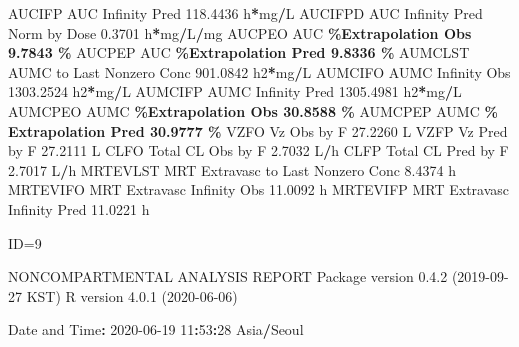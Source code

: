 \documentclass[
  10pt,
]{krantz}
\makeatletter
\newenvironment{Shaded}{\begin{snugshade}}{\end{snugshade}}
\newcommand{\DecValTok}[1]{\textcolor[rgb]{0.00,0.00,0.81}{#1}}
\newcommand{\FloatTok}[1]{\textcolor[rgb]{0.00,0.00,0.81}{#1}}
\newcommand{\NormalTok}[1]{#1}
\newcommand{\OperatorTok}[1]{\textcolor[rgb]{0.81,0.36,0.00}{\textbf{#1}}}
\newcommand{\StringTok}[1]{\textcolor[rgb]{0.31,0.60,0.02}{#1}}
\newenvironment{kframe}{%
\medskip{}
\setlength{\fboxsep}{.8em}
 \def\at@end@of@kframe{}%
 \ifinner\ifhmode%
  \def\at@end@of@kframe{\end{minipage}}%
  \begin{minipage}{\columnwidth}%
 \fi\fi%
 \def\FrameCommand##1{\hskip\@totalleftmargin \hskip-\fboxsep
 \colorbox{shadecolor}{##1}\hskip-\fboxsep
     \hskip-\linewidth \hskip-\@totalleftmargin \hskip\columnwidth}%
 \MakeFramed {\advance\hsize-\width
   \@totalleftmargin\z@ \linewidth\hsize
   \@setminipage}}%
 {\par\unskip\endMakeFramed%
 \at@end@of@kframe}
\renewenvironment{Shaded}{\begin{kframe}}{\end{kframe}}
\makeatother
\begin{document}
\begin{Shaded}
\begin{Highlighting}[]
\NormalTok{AUCIFP     AUC Infinity Pred                             }\FloatTok{118.4436}\NormalTok{ h}\OperatorTok{*}\NormalTok{mg}\OperatorTok{/}\NormalTok{L}
\NormalTok{AUCIFPD    AUC Infinity Pred Norm by Dose                  }\FloatTok{0.3701}\NormalTok{ h}\OperatorTok{*}\NormalTok{mg}\OperatorTok{/}\NormalTok{L}\OperatorTok{/}\NormalTok{mg}
\NormalTok{AUCPEO     AUC }\OperatorTok{\%Extrapolation Obs                          9.7843 \%}
\NormalTok{AUCPEP     AUC }\OperatorTok{\%Extrapolation Pred                         9.8336 \%}
\NormalTok{AUMCLST    AUMC to Last Nonzero Conc                     }\FloatTok{901.0842}\NormalTok{ h2}\OperatorTok{*}\NormalTok{mg}\OperatorTok{/}\NormalTok{L}
\NormalTok{AUMCIFO    AUMC Infinity Obs                            }\FloatTok{1303.2524}\NormalTok{ h2}\OperatorTok{*}\NormalTok{mg}\OperatorTok{/}\NormalTok{L}
\NormalTok{AUMCIFP    AUMC Infinity Pred                           }\FloatTok{1305.4981}\NormalTok{ h2}\OperatorTok{*}\NormalTok{mg}\OperatorTok{/}\NormalTok{L}
\NormalTok{AUMCPEO    AUMC }\OperatorTok{\%Extrapolation Obs                        30.8588 \%}
\NormalTok{AUMCPEP    AUMC }\OperatorTok{\% Extrapolation Pred                      30.9777 \%}
\NormalTok{VZFO       Vz Obs by F                                    }\FloatTok{27.2260}\NormalTok{ L}
\NormalTok{VZFP       Vz Pred by F                                   }\FloatTok{27.2111}\NormalTok{ L}
\NormalTok{CLFO       Total CL Obs by F                               }\FloatTok{2.7032}\NormalTok{ L}\OperatorTok{/}\NormalTok{h}
\NormalTok{CLFP       Total CL Pred by F                              }\FloatTok{2.7017}\NormalTok{ L}\OperatorTok{/}\NormalTok{h}
\NormalTok{MRTEVLST   MRT Extravasc to Last Nonzero Conc              }\FloatTok{8.4374}\NormalTok{ h}
\NormalTok{MRTEVIFO   MRT Extravasc Infinity Obs                     }\FloatTok{11.0092}\NormalTok{ h}
\NormalTok{MRTEVIFP   MRT Extravasc Infinity Pred                    }\FloatTok{11.0221}\NormalTok{ h}





\NormalTok{ID=}\DecValTok{9}

\NormalTok{                        NONCOMPARTMENTAL ANALYSIS REPORT}
\NormalTok{                       Package version }\DecValTok{0}\NormalTok{.}\FloatTok{4.2}\NormalTok{ (}\DecValTok{2019{-}09{-}27}\NormalTok{ KST)}
\NormalTok{                          R version }\DecValTok{4}\NormalTok{.}\FloatTok{0.1}\NormalTok{ (}\DecValTok{2020{-}06{-}06}\NormalTok{)}

\NormalTok{Date and Time}\OperatorTok{:}\StringTok{ }\DecValTok{2020{-}06{-}19} \DecValTok{11}\OperatorTok{:}\DecValTok{53}\OperatorTok{:}\DecValTok{28}\NormalTok{ Asia}\OperatorTok{/}\NormalTok{Seoul}


\end{Highlighting}
\end{Shaded}
\end{document}
